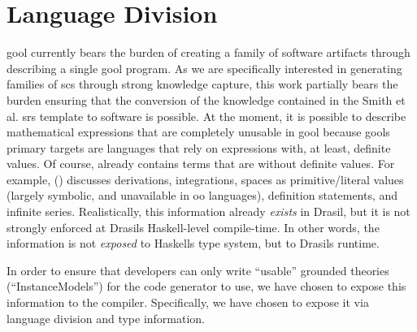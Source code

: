 \section{Language Division}

\acs{gool} currently bears the burden of creating a family of software artifacts
through describing a single \acs{gool} program. As we are specifically
interested in generating families of \acs{scs} through strong knowledge capture,
this work partially bears the burden ensuring that the conversion of the
knowledge contained in the Smith et al. \acs{srs} template
\cite{SmithAndLai2005} to software is possible. At the moment, it is possible to
describe mathematical expressions that are completely unusable in \acs{gool}
because \acsp{gool} primary targets are languages that rely on expressions with,
at least, definite values. Of course, \Expr{} already contains terms that are
without definite values. For example, \Expr{} ()
discusses derivations, integrations, spaces as primitive/literal values (largely
symbolic, and unavailable in \acs{oo} languages), definition statements, and
infinite series. Realistically, this information already \textit{exists} in
Drasil, but it is not strongly enforced at Drasils Haskell-level compile-time.
In other words, the information is not \textit{exposed} to Haskells type system,
but to Drasils runtime.

In order to ensure that developers can only write ``usable'' grounded theories
(``InstanceModels'') for the code generator to use, we have chosen to expose
this information to the compiler. Specifically, we have chosen to expose it via
language division and type information.

\languageDivision{}


